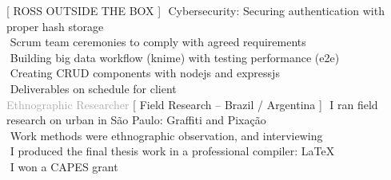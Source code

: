 \begin{cvtable}
%
	{[ R{\scriptsize OSS} O{\scriptsize UTSIDE THE} B{\scriptsize OX} ]}{
        \textperiodcentered $ $ Cybersecurity: Securing authentication with proper hash storage \\
        \textperiodcentered $ $ Scrum team ceremonies to comply with agreed requirements \\        
        \textperiodcentered $ $ Building big data workflow (knime) with testing performance (e2e) \\        
        \textperiodcentered $ $ Creating CRUD components with nodejs and expressjs \\
        \textperiodcentered $ $ Deliverables on schedule for client \\
        }  
% 
	{%
	\textcolor{darkgray}{%
    Ethnographic Researcher
	}}
	{
    [ Field Research -- Brazil / Argentina ]%
	}
	{
        \textperiodcentered $ $ I ran field research on urban in São Paulo: Graffiti and Pixação \\ 
        \textperiodcentered $ $ Work methods were ethnographic observation, and %
        interviewing \\
        \textperiodcentered $ $ I produced the final thesis work in a professional compiler: \LaTeX \\
        \textperiodcentered $ $ I won a CAPES grant \\
	}
	
\end{cvtable}
